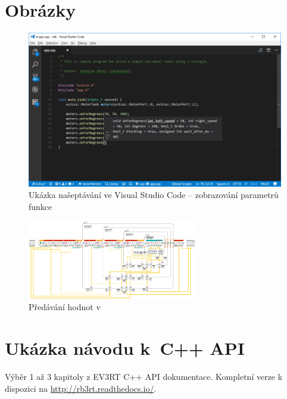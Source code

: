 \chapter{Obrázky}


\begin{figure}[h]
    \centering
    \includegraphics[width=\textwidth]{images/visual-studio-code_intellisense-param.png}
    \caption{Ukázka našeptávání ve Visual Studio Code -- zobrazování parametrů funkce}
    \label{fig:visual-studio-code_intellisense-param}
\end{figure}


\begin{figure}[h]
	\centering
	\includegraphics[angle=-90,origin=c,width=280px]{images/lego-soft_legolib_match_array_length.png}
	\caption[Předávání hodnot v~\legoSW{}]{Předávání hodnot v~\legoSW{}}
	\label{fig:lego-soft_legolib_match_array_length}
\end{figure}



\chapter{Ukázka návodu k~C++ API}

Výběr 1 až 3 kapitoly z EV3RT C++ API dokumentace. Kompletní verze k dispozici na \url{http://rb3rt.readthedocs.io/}.

